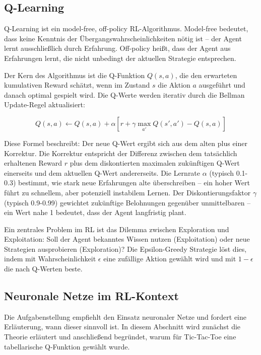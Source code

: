 \subsection{Q-Learning}

Q-Learning ist ein model-free, off-policy \ac{RL}-Algorithmus. \glqq Model-free\grqq{} bedeutet, dass keine Kenntnis der Übergangswahrscheinlichkeiten nötig ist -- der Agent lernt ausschließlich durch Erfahrung. \glqq Off-policy\grqq{} heißt, dass der Agent aus Erfahrungen lernt, die nicht unbedingt der aktuellen Strategie entsprechen.

Der Kern des Algorithmus ist die Q-Funktion $Q(s, a)$, die den erwarteten kumulativen Reward schätzt, wenn im Zustand $s$ die Aktion $a$ ausgeführt und danach optimal gespielt wird. Die Q-Werte werden iterativ durch die Bellman Update-Regel aktualisiert:\autocite{noauthor_bellman-gleichung_nodate}

\begin{equation}
Q(s, a) \leftarrow Q(s, a) + \alpha \left[ r + \gamma \max_{a'} Q(s', a') - Q(s, a) \right]
\end{equation}

Diese Formel beschreibt: Der neue Q-Wert ergibt sich aus dem alten plus einer Korrektur. Die Korrektur entspricht der Differenz zwischen dem tatsächlich erhaltenen Reward $r$ plus dem diskontierten maximalen zukünftigen Q-Wert einerseits und dem aktuellen Q-Wert andererseits. Die Lernrate $\alpha$ (typisch 0.1-0.3) bestimmt, wie stark neue Erfahrungen alte überschreiben -- ein hoher Wert führt zu schnellem, aber potenziell instabilem Lernen. Der Diskontierungsfaktor $\gamma$ (typisch 0.9-0.99) gewichtet zukünftige Belohnungen gegenüber unmittelbaren -- ein Wert nahe 1 bedeutet, dass der Agent langfristig plant.

Ein zentrales Problem im \ac{RL} ist das Dilemma zwischen Exploration und Exploitation: Soll der Agent bekanntes Wissen nutzen (Exploitation) oder neue Strategien ausprobieren (Exploration)? Die Epsilon-Greedy Strategie löst dies, indem mit Wahrscheinlichkeit $\epsilon$ eine zufällige Aktion gewählt wird und mit $1-\epsilon$ die nach Q-Werten beste.

\subsection{Neuronale Netze im \ac{RL}-Kontext}

Die Aufgabenstellung empfiehlt den Einsatz neuronaler Netze und fordert eine Erläuterung, wann dieser sinnvoll ist. In diesem Abschnitt wird zunächst die Theorie erläutert und anschließend begründet, warum für Tic-Tac-Toe eine tabellarische Q-Funktion gewählt wurde.

